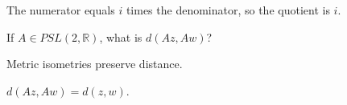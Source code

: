 \begin{solution}
The numerator equals \(i\) times the denominator, so the quotient is \(i\).
\end{solution}

\begin{exercise}\label{exr:vii33-ped-16}
If \(A\in PSL(2,\mathbb R)\), what is \(d(Az,Aw)\)?
\end{exercise}

\begin{hint}
Metric isometries preserve distance.
\end{hint}

\begin{solution}
\(d(Az,Aw)=d(z,w)\).
\end{solution}

